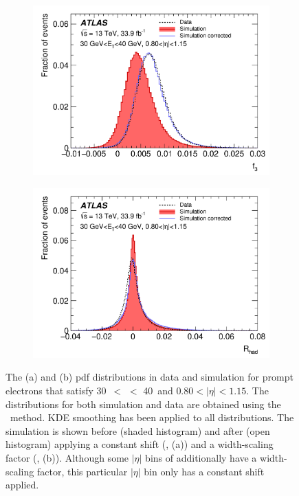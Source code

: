 \begin{figure}[t]
\centering
\begin{subfigure}[b]{0.49\textwidth}
\centering
\includegraphics[width=1.00\textwidth]{figs/egamma/f3_DataVSMC.png}
\caption{}
\end{subfigure}
\hfill
\begin{subfigure}[b]{0.49\textwidth}
\centering
\includegraphics[width=1.00\textwidth]{figs/egamma/R_had_DataVsMC.png}
\caption{}
\end{subfigure}
\caption[Example pdfs illustrating shift and width corrections applied to MC for discriminant tuning procedure]{The \fIII (a) and \rhad (b)
  pdf distributions in data and simulation for prompt electrons that satisfy 30~\GeV $<$ \et $<$ 40~\GeV and $0.80 < \left|\eta\right| < 1.15$.
  The distributions for both simulation and data are obtained using the \Zee\ \tnp method.
  KDE smoothing has been applied to all distributions.
  The simulation is shown before (shaded histogram) and after (open histogram) applying a constant shift (\fIII, (a)) and a width-scaling factor (\rhad, (b)). 
  Although some $\left|\eta\right|$ bins of \fIII additionally
  have a width-scaling factor, this particular $\left|\eta\right|$ bin only has a constant shift applied.
}
\label{fig:egamma:data_MC_comparison_shifts}
\end{figure}

